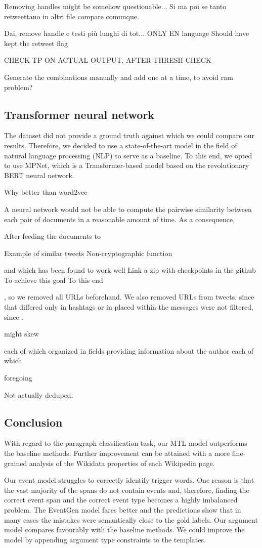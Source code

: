 \documentclass[runningheads]{llncs}
\begin{document}
Removing handles might be somehow questionable... Si ma poi se tanto retweettano in altri file compare comunque.

Dai, remove handle e testi più lunghi di tot...
ONLY EN language
Should have kept the retweet flag


CHECK TP ON ACTUAL OUTPUT, AFTER THRESH CHECK

Generate the combinations manually and add one at a time, to avoid ram problem?

\subsection{Transformer neural network}
\label{subsec:models:transformer}

The dataset did not provide a ground truth against which we could compare our results. Therefore, we decided to use a state-of-the-art model in the field of natural language processing (NLP) to serve as a baseline. To this end, we opted to use MPNet, which is a Transformer-based model based on the revolutionary BERT neural network. 

Why better than word2vec

A neural network would not be able to compute the pairwise similarity between each pair of documents in a reasonable amount of time. As a consequence, 

After feeding the documents to 

Example of similar tweets
Non-cryptographic function

and which has been found to work well  
Link a zip with checkpoints in the github
To achieve this goal
To this end

, so we removed all URLs 
beforehand. 
We also removed URLs from tweets, since that differed only in hashtags or in  placed within the messages were not filtered, since . 

might skew

each of which organized in fields providing information about the author
each of which  

foregoing

Not actually deduped.

\subsection{Conclusion}

With regard to the paragraph classification task, our MTL model outperforms the baseline methods. Further improvement can be attained with a more fine-grained analysis of the Wikidata properties of each Wikipedia page.

Our event model struggles to correctly identify trigger words. One reason is that the vast majority of the spans do not contain events and, therefore, finding the correct event span and the correct event type becomes a highly imbalanced problem. The EventGen model fares better and the predictions show that in many cases the mistakes were semantically close to the gold labels. Our argument model compares favourably with the baseline methods. We could improve the model by appending argument type constraints to the templates.



\end{document}
